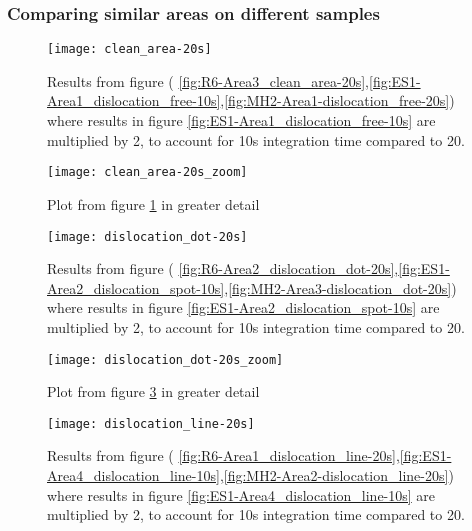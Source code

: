 \subsubsection{Comparing similar areas on different samples}


\begin{figure}[H]
\centering
\texttt{[image: clean\_area-20s]}
\caption[Comparisons in a clean area]{Results from figure ( \ref{fig:R6-Area3_clean_area-20s},\ref{fig:ES1-Area1_dislocation_free-10s},\ref{fig:MH2-Area1-dislocation_free-20s}) where results in figure \ref{fig:ES1-Area1_dislocation_free-10s} are multiplied by 2, to account for 10s integration time compared to 20.}
\label{fig:clean_area-20s_comparison}%
\end{figure}

\begin{figure}[H]
\centering
\texttt{[image: clean\_area-20s\_zoom]}
\caption[Comparisons in a clean area]{Plot from figure \ref{fig:clean_area-20s_comparison} in greater detail}
\label{fig:clean_area-20s_zoom_comparison}%
\end{figure}

\begin{figure}[H]
\centering
\texttt{[image: dislocation\_dot-20s]}
\caption[Comparisons in a dislocation dot]{Results from figure ( \ref{fig:R6-Area2_dislocation_dot-20s},\ref{fig:ES1-Area2_dislocation_spot-10s},\ref{fig:MH2-Area3-dislocation_dot-20s}) where results in figure \ref{fig:ES1-Area2_dislocation_spot-10s} are multiplied by 2, to account for 10s integration time compared to 20. }
\label{fig:dislocation_dot-20s_comparison}%
\end{figure}

\begin{figure}[H]
\centering
\texttt{[image: dislocation\_dot-20s\_zoom]}
\caption[Comparisons in a dislocation dot]{Plot from figure \ref{fig:dislocation_dot-20s_comparison} in greater detail}
\label{fig:dislocation_dot-20s_zoom_comparison}%
\end{figure}

\begin{figure}[H]
\centering
\texttt{[image: dislocation\_line-20s]}
\caption[Comparisons in a dislocation line]{Results from figure ( \ref{fig:R6-Area1_dislocation_line-20s},\ref{fig:ES1-Area4_dislocation_line-10s},\ref{fig:MH2-Area2-dislocation_line-20s}) where results in figure \ref{fig:ES1-Area4_dislocation_line-10s} are multiplied by 2, to account for 10s integration time compared to 20. }
\label{fig:dislocation_line-20s_comparison}%
\end{figure}


